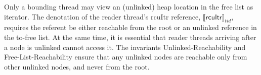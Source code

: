 Only a bounding thread may view an (unlinked) heap location in the free list as \textsf{iterator}. The denotation of the reader thread's \textsf{rcuItr} reference, $\llbracket \mathsf{rcuItr} \rrbracket_{tid}$, requires the referent be either reachable from the root or an unlinked reference in the to-free list.
At the same time, it is essential that reader threads arriving after a node is unlinked cannot access it.
The invariants \textsf{Unlinked-Reachability} and \textsf{Free-List-Reachability} ensure that any unlinked nodes are reachable only from other unlinked nodes, and never from the root.
